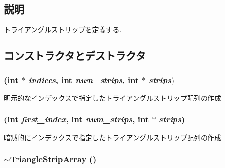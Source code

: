\subsection{説明}
トライアングルストリップを定義する. 

\subsection{コンストラクタとデストラクタ}
\hypertarget{classm3g_1_1TriangleStripArray_57d4e874819367084aeadb11593c4436}{
\subsubsection[{TriangleStripArray}]{ (int $\ast$ {\em indices}, \/  int {\em num\_\-strips}, \/  int $\ast$ {\em strips})}}
\label{classm3g_1_1TriangleStripArray_57d4e874819367084aeadb11593c4436}


明示的なインデックスで指定したトライアングルストリップ配列の作成 \hypertarget{classm3g_1_1TriangleStripArray_d2ca9884a6ccf32da3cee977549b5ee0}{
\subsubsection[{TriangleStripArray}]{ (int {\em first\_\-index}, \/  int {\em num\_\-strips}, \/  int $\ast$ {\em strips})}}
\label{classm3g_1_1TriangleStripArray_d2ca9884a6ccf32da3cee977549b5ee0}


暗黙的にインデックスで指定したトライアングルストリップ配列の作成 \hypertarget{classm3g_1_1TriangleStripArray_1cb3853bf79b7710d57044da818d2cde}{
\subsubsection[{$\sim$TriangleStripArray}]{\setlength{\rightskip}{0pt plus 5cm}$\sim${\bf TriangleStripArray} ()}}
\label{classm3g_1_1TriangleStripArray_1cb3853bf79b7710d57044da818d2cde}


